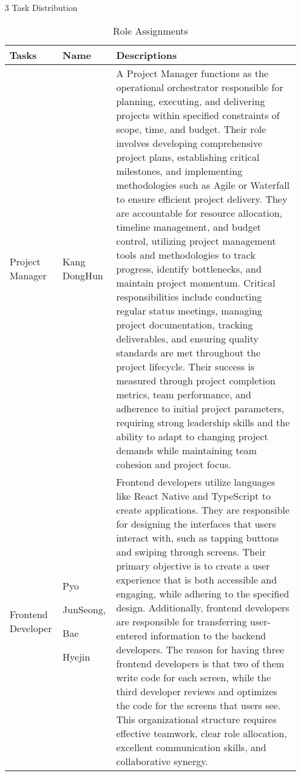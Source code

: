 \documentclass[conference]{IEEEtran}
\begin{document}
\begin{enumerate}

\item[3] Task Distribution

\begin{table}[h]
\caption{Role Assignments}
\def\arraystretch{1.24} \small

\begin{tabular}{|p{1.2cm}|p{1.2cm}|p{5.4cm}|}
    \hline
    Tasks & Name & Descriptions \\
    \hline
    Project Manager & Kang DongHun & A Project Manager functions as the operational orchestrator responsible for planning, executing, and delivering projects within specified constraints of scope, time, and budget. Their role involves developing comprehensive project plans, establishing critical milestones, and implementing methodologies such as Agile or Waterfall to ensure efficient project delivery. They are accountable for resource allocation, timeline management, and budget control, utilizing project management tools and methodologies to track progress, identify bottlenecks, and maintain project momentum. Critical responsibilities include conducting regular status meetings, managing project documentation, tracking deliverables, and ensuring quality standards are met throughout the project lifecycle. Their success is measured through project completion metrics, team performance, and adherence to initial project parameters, requiring strong leadership skills and the ability to adapt to changing project demands while maintaining team cohesion and project focus.  \\ 
    \hline
    Frontend Developer & Pyo \par JunSeong, \par Bae \par Hyejin & Frontend developers utilize languages like React Native and TypeScript to create applications. They are responsible for designing the interfaces that users interact with, such as tapping buttons and swiping through screens. Their primary objective is to create a user experience that is both accessible and engaging, while adhering to the specified design. Additionally, frontend developers are responsible for transferring user-entered information to the backend developers. The reason for having three frontend developers is that two of them write code for each screen, while the third developer reviews and optimizes the code for the screens that users see. This organizational structure requires effective teamwork, clear role allocation, excellent communication skills, and collaborative synergy. \\
    \hline
\end{tabular}
\end{table}


\end{enumerate}
\end{document}
